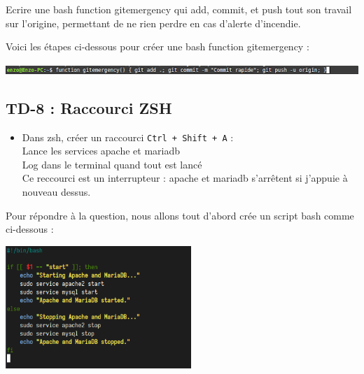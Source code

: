 \documentclass[12pt]{article}
\begin{document}
\vspace{0.3cm}

Ecrire une bash function gitemergency qui add, commit, et push tout son travail sur l'origine, permettant de ne rien perdre en cas d'alerte d'incendie.

\vspace{0.3cm}

Voici les étapes ci-dessous pour créer une bash function gitemergency : 

\vspace{0.3cm}

\begin{center}
  \includegraphics[width=14cm]{Image-TD-5/gitemergency.png}
\end{center}

\newpage

\subsection{TD-8 : Raccourci ZSH}

\vspace{0.3cm}

\begin{itemize}
  \item Dans zsh, créer un raccourci \texttt{Ctrl + Shift + A} :\\
  Lance les services apache et mariadb\\
  Log dans le terminal quand tout est lancé\\
  Ce reccourci est un interrupteur : apache et mariadb s'arrêtent si j'appuie à nouveau dessus.
\end{itemize}

\vspace{0.3cm}

Pour répondre à la question, nous allons tout d'abord crée un script bash comme ci-dessous : 

\vspace{0.3cm}

\begin{center}
  \includegraphics[width=7cm]{Image-TD-8/Sevices.png}
\end{center}
\end{document}
